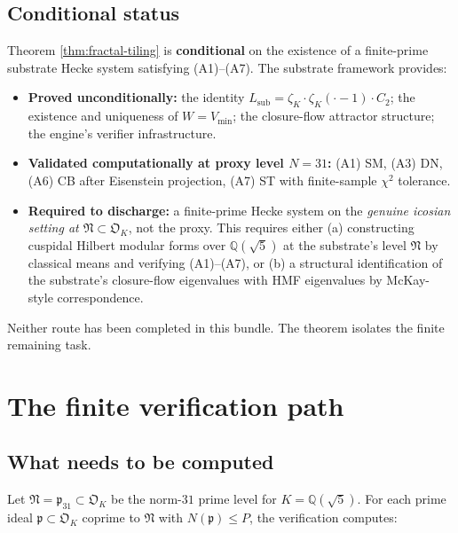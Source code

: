 \documentclass[11pt,a4paper]{article}
\theoremstyle{definition}
\newcommand{\Q}{\mathbb{Q}}
\newcommand{\sub}{\mathrm{sub}}
\newcommand{\Vmin}{V_{\min}}
\begin{document}
\subsection{Conditional status}
\begin{tcolorbox}[colback=red!2,colframe=red!50!black,arc=2mm,
    title={\textbf{What is and is not proved}},fonttitle=\bfseries,breakable]
Theorem \ref{thm:fractal-tiling} is \textbf{conditional} on the existence of a
finite-prime substrate Hecke system satisfying (A1)--(A7). The substrate
framework provides:
\begin{itemize}
\item \textbf{Proved unconditionally:} the identity $L_\sub=\zeta_K\cdot\zeta_K(\cdot-1)\cdot C_2$;
      the existence and uniqueness of $W=\Vmin$; the closure-flow attractor
      structure; the engine's verifier infrastructure.
\item \textbf{Validated computationally at proxy level $N=31$:} (A1) SM,
      (A3) DN, (A6) CB after Eisenstein projection, (A7) ST with finite-sample
      $\chi^2$ tolerance.
\item \textbf{Required to discharge:} a finite-prime Hecke system on the
      \emph{genuine icosian setting at $\mathfrak{N}\subset\mathfrak{O}_K$}, not the proxy.
      This requires either (a) constructing cuspidal Hilbert modular forms over
      $\Q(\sqrt{5})$ at the substrate's level $\mathfrak{N}$ by classical means
      and verifying (A1)--(A7), or (b) a structural identification of the
      substrate's closure-flow eigenvalues with HMF eigenvalues by McKay-style
      correspondence.
\end{itemize}
Neither route has been completed in this bundle. The theorem isolates the
finite remaining task.
\end{tcolorbox}

\section{The finite verification path}

\subsection{What needs to be computed}
Let $\mathfrak{N}=\mathfrak{p}_{31}\subset\mathfrak{O}_K$ be the norm-$31$
prime level for $K=\Q(\sqrt{5})$.
For each prime ideal $\mathfrak{p}\subset\mathfrak{O}_K$ coprime to
$\mathfrak{N}$ with $N(\mathfrak{p})\le P$, the verification computes:
\end{document}
